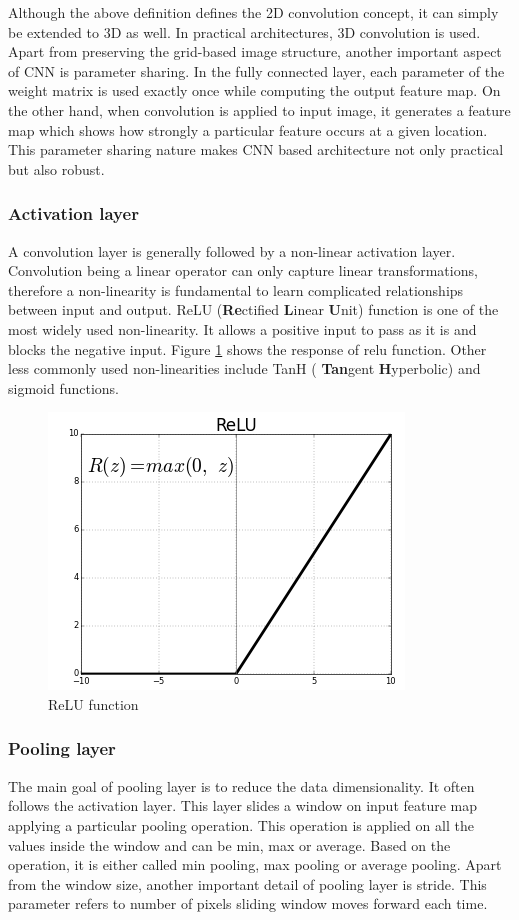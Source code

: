 Although the above definition defines the 2D convolution concept, it can simply be extended to 3D as well. In practical architectures, 3D convolution is used. Apart from preserving the grid-based image structure, another important aspect of CNN is parameter sharing. In the fully connected layer, each parameter of the weight matrix is used exactly once while computing the output feature map. On the other hand, when convolution is applied to input image, it generates a feature map which shows how strongly a particular feature occurs at a given location. This parameter sharing nature makes CNN based architecture not only practical but also robust.  

\subsubsection{Activation layer}
A convolution layer is generally followed by a non-linear activation layer. Convolution being a linear operator can only capture linear transformations, therefore a non-linearity is fundamental to learn complicated relationships between input and output. ReLU (\textbf{Re}ctified \textbf{L}inear \textbf{U}nit) function is one of the most widely used non-linearity. It allows a positive input to pass as it is and blocks the negative input. Figure \ref{fig:relu} shows the response of relu function. Other less commonly used non-linearities include TanH ( \textbf{Tan}gent  \textbf{H}yperbolic) and sigmoid functions.

\begin{figure}
    \centering
    \includegraphics[width=0.7\linewidth]{images/relu.png}
    \caption{ReLU function}
    \label{fig:relu}
\end{figure}


\subsubsection{Pooling layer}
The main goal of pooling layer is to reduce the data dimensionality. It often follows the activation layer. This layer slides a window on input feature map applying a particular pooling operation. This operation is applied on all the values inside the window and can be min, max or average. Based on the operation, it is either called min pooling, max pooling or average pooling. Apart from the window size, another important detail of pooling layer is stride. This parameter refers to number of pixels sliding window moves forward each time.

